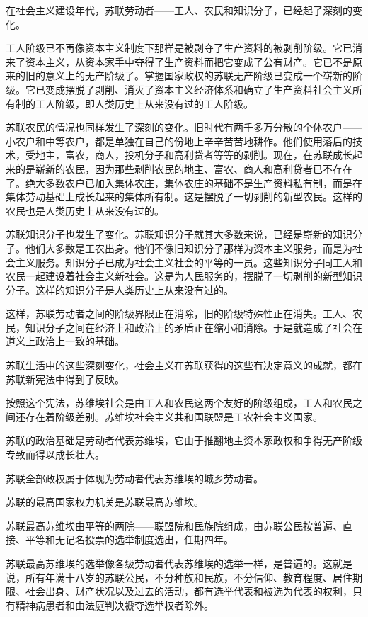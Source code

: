 在社会主义建设年代，苏联劳动者——工人、农民和知识分子，已经起了深刻的变化。

工人阶级已不再像资本主义制度下那样是被剥夺了生产资料的被剥削阶级。它已消来了资本主义，从资本家手中夺得了生产资料而把它变成了公有财产。它已不是原来的旧的意义上的无产阶级了。掌握国家政权的苏联无产阶级已变成一个崭新的阶级。它已变成摆脱了剥削、消灭了资本主义经济体系和确立了生产资料社会主义所有制的工人阶级，即人类历史上从来没有过的工人阶级。

苏联农民的情况也同样发生了深刻的变化。旧时代有两千多万分散的个体农户——小农户和中等农户，都是单独在自己的份地上辛辛苦苦地耕作。他们使用落后的技术，受地主，富农，商人，投机分子和高利贷者等等的剥削。现在，在苏联成长起来的是崭新的农民，因为那些剥削农民的地主、富农、商人和高利贷者已不存在了。绝大多数农户已加入集体农庄，集体农庄的基础不是生产资料私有制，而是在集体劳动基础上成长起来的集体所有制。这是摆脱了一切剥削的新型农民。这样的农民也是人类历史上从来没有过的。

苏联知识分子也发生了变化。苏联知识分子就其大多数来说，已经是崭新的知识分子。他们大多数是工农出身。他们不像旧知识分子那样为资本主义服务，而是为社会主义服务。知识分子已成为社会主义社会的平等的一员。这些知识分子同工人和农民一起建设着社会主义新社会。这是为人民服务的，摆脱了一切剥削的新型知识分子。这样的知识分子是人类历史上从来没有过的。

这样，苏联劳动者之间的阶级界限正在消除，旧的阶级特殊性正在消失。工人、农民，知识分子之间在经济上和政治上的矛盾正在缩小和消除。于是就造成了社会在道义上政治上一致的基础。

苏联生活中的这些深刻变化，社会主义在苏联获得的这些有决定意义的成就，都在苏联新宪法中得到了反映。

按照这个宪法，苏维埃社会是由工人和农民这两个友好的阶级组成，工人和农民之间还存在着阶级差别。苏维埃社会主义共和国联盟是工农社会主义国家。

苏联的政治基础是劳动者代表苏维埃，它由于推翻地主资本家政权和争得无产阶级专致而得以成长壮大。

苏联全部政权属于体现为劳动者代表苏维埃的城乡劳动者。

苏联的最高国家权力机关是苏联最高苏维埃。

苏联最高苏维埃由平等的两院——联盟院和民族院组成，由苏联公民按普遍、直接、平等和无记名投票的选举制度选出，任期四年。

苏联最高苏维埃的选举像各级劳动者代表苏维埃的选举一样，是普遍的。这就是说，所有年满十八岁的苏联公民，不分种族和民族，不分信仰、教育程度、居住期限、社会出身、财产状况以及过去的活动，都有选举代表和被选为代表的权利，只有精神病患者和由法庭判决褫夺选举权者除外。

